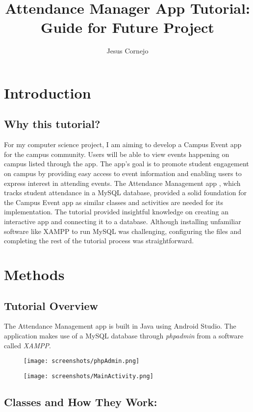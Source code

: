 \documentclass[10pt,twocolumn]{article}
\title{Attendance Manager App Tutorial:\\
Guide for Future Project}
\author{Jesus Cornejo}
\affiliation{Occidental College}
\begin{document}
\maketitle

\section{Introduction}

\subsection{Why this tutorial?}
For my computer science project, I am aiming to develop a Campus Event app for the campus community. Users will be able to view events happening on campus listed through the app. The app's goal is to promote student engagement on campus by providing easy access to event information and enabling users to express interest in attending events.
The Attendance Management app \cite{Youtube}, which tracks student attendance in a MySQL database, provided a solid foundation for the Campus Event app as similar classes and activities are needed for its implementation. The tutorial provided insightful knowledge on creating an interactive app and connecting it to a database. Although installing unfamiliar software like XAMPP to run MySQL was challenging, configuring the files and completing the rest of the tutorial process was straightforward. 


\section{Methods}

\subsection{Tutorial Overview}
The Attendance Management app is built in Java using Android Studio. The application makes use of a MySQL database through \textit{phpadmin} from a software called \textit{XAMPP}.
\begin{figure}[h]
\texttt{[image: screenshots/phpAdmin.png]}
\centering
\end{figure}

\begin{figure}[h]
\texttt{[image: screenshots/MainActivity.png]}
\centering
\end{figure} 

\subsection{Classes and How They Work:}
\end{document}
